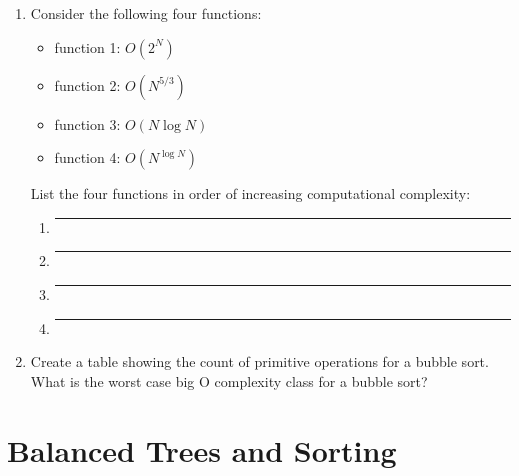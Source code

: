 \documentclass{article}
\begin{document}
\begin{enumerate}
\begin{enumerate}[label=\arabic*.]
			\vspace{2cm}
		\end{enumerate}
	\newpage
	\item Consider the following four functions:
		\begin{itemize}
			\item function 1: \(O(2^N )\)
			\item function 2: \(O(N^{5 / 3})\)
			\item function 3: \(O(N \log N)\)
			\item function 4: \(O(N ^ {\log N})\)
		\end{itemize}
		List the four functions in order of increasing computational complexity:
		\begin{enumerate}[label=\arabic*.]
			\item \rule{4cm}{0.1mm}
			\item \rule{4cm}{0.1mm}
			\item \rule{4cm}{0.1mm}
			\item \rule{4cm}{0.1mm}
		\end{enumerate}
	\item Create a table showing the count of primitive operations for a bubble sort. What is the worst case big O complexity class for a bubble sort?
	\vspace{4cm}
 
\end{enumerate}

\medskip
\section{Balanced Trees and Sorting}
\end{document}
